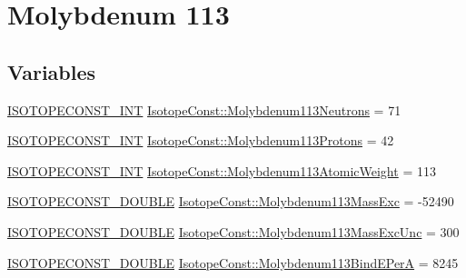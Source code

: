 \hypertarget{group___isotope_const-_molybdenum-_mo113}{}\section{Molybdenum 113}
\label{group___isotope_const-_molybdenum-_mo113}
\subsection*{Variables}
\begin{DoxyCompactItemize}
\item 
\mbox{\hyperlink{group___isotope_const-_macros_ga5f18360b3e99483a35c32d789e62621c}{I\+S\+O\+T\+O\+P\+E\+C\+O\+N\+S\+T\+\_\+\+I\+NT}} \mbox{\hyperlink{group___isotope_const-_molybdenum-_mo113_ga7fcfc7aa741d8b24d88ff98368c3fdf7}{Isotope\+Const\+::\+Molybdenum113\+Neutrons}} = 71
\item 
\mbox{\hyperlink{group___isotope_const-_macros_ga5f18360b3e99483a35c32d789e62621c}{I\+S\+O\+T\+O\+P\+E\+C\+O\+N\+S\+T\+\_\+\+I\+NT}} \mbox{\hyperlink{group___isotope_const-_molybdenum-_mo113_ga95fcf35c84297bb88f55171637397f4a}{Isotope\+Const\+::\+Molybdenum113\+Protons}} = 42
\item 
\mbox{\hyperlink{group___isotope_const-_macros_ga5f18360b3e99483a35c32d789e62621c}{I\+S\+O\+T\+O\+P\+E\+C\+O\+N\+S\+T\+\_\+\+I\+NT}} \mbox{\hyperlink{group___isotope_const-_molybdenum-_mo113_gabe8c5abc98e0b06ea6828ad10e87bf7b}{Isotope\+Const\+::\+Molybdenum113\+Atomic\+Weight}} = 113
\item 
\mbox{\hyperlink{group___isotope_const-_macros_ga8f45a7272ce02c0b4c65c44636ed719a}{I\+S\+O\+T\+O\+P\+E\+C\+O\+N\+S\+T\+\_\+\+D\+O\+U\+B\+LE}} \mbox{\hyperlink{group___isotope_const-_molybdenum-_mo113_gac91e8a2ec46a66e4d9852d19515a1e29}{Isotope\+Const\+::\+Molybdenum113\+Mass\+Exc}} = -\/52490
\item 
\mbox{\hyperlink{group___isotope_const-_macros_ga8f45a7272ce02c0b4c65c44636ed719a}{I\+S\+O\+T\+O\+P\+E\+C\+O\+N\+S\+T\+\_\+\+D\+O\+U\+B\+LE}} \mbox{\hyperlink{group___isotope_const-_molybdenum-_mo113_gad9e57d816b350c56bb263bcac7b0c2b1}{Isotope\+Const\+::\+Molybdenum113\+Mass\+Exc\+Unc}} = 300
\item 
\mbox{\hyperlink{group___isotope_const-_macros_ga8f45a7272ce02c0b4c65c44636ed719a}{I\+S\+O\+T\+O\+P\+E\+C\+O\+N\+S\+T\+\_\+\+D\+O\+U\+B\+LE}} \mbox{\hyperlink{group___isotope_const-_molybdenum-_mo113_ga2dfaa939dcf76f781313cc7494dcdb8e}{Isotope\+Const\+::\+Molybdenum113\+Bind\+E\+PerA}} = 8245
\item 

\end{DoxyCompactItemize}
